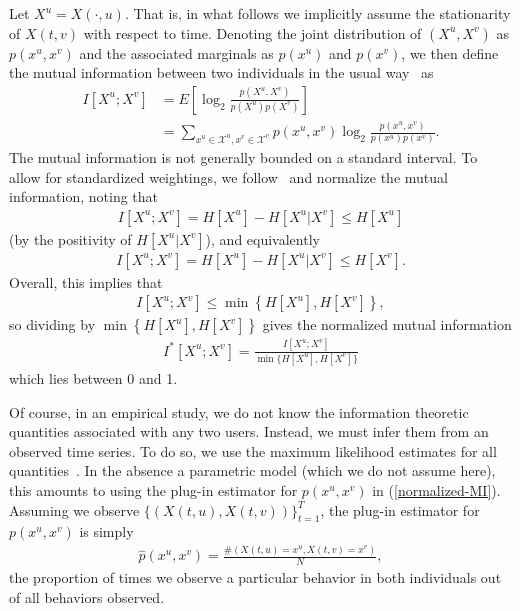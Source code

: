 \documentclass[12pt]{article}
\begin{document}
Let $X^{u} = X(\cdot, u).$ That is, in what follows we implicitly assume the stationarity of $X(t, v)$ with respect to time. Denoting the joint distribution of $(X^{u}, X^{v})$ as $p(x^{u}, x^{v})$ and the associated marginals as $p(x^{u})$ and $p(x^{v})$, we then define the mutual information between two individuals in the usual way~\cite{cover1994elements} as
\begin{align}
	I[X^{u}; X^{v}] &= E\left[\log_{2} \frac{p(X^{u}, X^{v})}{p(X^{u})p(X^{v})}\right]\\
	&= \sum_{x^{u} \in \mathcal{X}^{u}, x^{v} \in \mathcal{X}^{v}} p(x^{u}, x^{v}) \log_{2} \frac{p(x^{u}, x^{v})}{p(x^{u}) p(x^{v})}.
\end{align}
The mutual information is not generally bounded on a standard interval. To allow for standardized weightings, we follow~\cite{shalizi2007discovering} and normalize the mutual information, noting that
\begin{align}
	I[X^{u}; X^{v}] = H[X^{u}] - H[X^{u} | X^{v}] \leq H[X^{u}]
\end{align}
(by the positivity of $H[X^{u} | X^{v}]$), and equivalently
\begin{align}
	I[X^{u}; X^{v}] = H[X^{u}] - H[X^{u} | X^{v}] \leq H[X^{v}].
\end{align}
Overall, this implies that
\begin{align}
	I[X^{u}; X^{v}] \leq \min \left\{ H[X^{u}], H[X^{v}]\right\},
\end{align}
so dividing by $\min \left\{ H[X^{u}], H[X^{v}]\right\}$ gives the normalized mutual information
\begin{align}
	I^{*}[X^{u}; X^{v}] = \frac{I[X^{u}; X^{v}]}{\min \{ H[X^{u}], H[X^{v}]\}} \label{normalized-MI}
\end{align}
which lies between 0 and 1.

Of course, in an empirical study, we do not know the information theoretic quantities associated with any two users. Instead, we must infer them from an observed time series. To do so, we use the maximum likelihood estimates for all quantities~\cite{paninski2003estimation}. In the absence a parametric model (which we do not assume here), this amounts to using the plug-in estimator for $p(x^{u}, x^{v})$ in (\ref{normalized-MI}). Assuming we observe $\{ (X(t, u), X(t, v)) \}_{t = 1}^{T}$, the plug-in estimator for $p(x^{u}, x^{v})$ is simply
\begin{align}
	\hat{p}(x^{u}, x^{v}) = \frac{\#(X(t, u) = x^{u}, X(t, v) = x^{v})}{N},
\end{align}
the proportion of times we observe a particular behavior in both individuals out of all behaviors observed.
\end{document}
